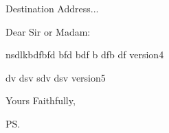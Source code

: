 \documentclass{letter}
\begin{document}
\begin{letter}{Destination Address...}
\opening{Dear Sir or Madam:}


nsdlkbdfbfd
bfd
bdf
b
dfb
df
version4

dv
dsv
sdv
dsv
version5

\closing{Yours Faithfully,}
\ps



\end{letter}
\end{document}
